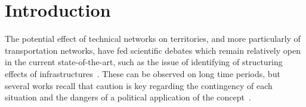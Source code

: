 \documentclass[11pt]{article}
\begin{document}
\section{Introduction}


The potential effect of technical networks on territories, and more particularly of transportation networks, have fed scientific debates which remain relatively open in the current state-of-the-art, such as the issue of identifying of structuring effects of infrastructures~\citep{offner1993effets}. These can be observed on long time periods, but several works recall that caution is key regarding the contingency of each situation and the dangers of a political application of the concept~\citep{espacegeo2014effets}.
\end{document}
